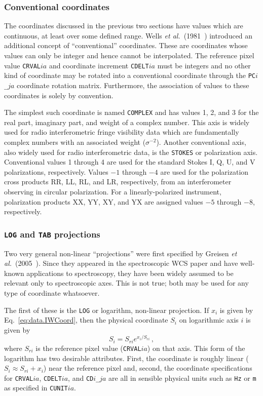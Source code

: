 \documentclass[twoside]{article}
\newcommand{\etal}{{\it et al.}}
\newcommand{\keyw}[1]{\hbox{{\tt #1}}}
\begin{document}
\subsubsection{Conventional coordinates}

The coordinates discussed in the previous two sections have values
which are continuous, at least over some defined range.  Wells
\etal~(1981~\cite{WGH81}) introduced an additional concept of
``conventional''  coordinates.  These are coordinates whose values can
only be integer and hence cannot be interpolated.  The reference pixel
value \keyw{CRVAL$ia$} and coordinate increment \keyw{CDELT$ia$} must
be integers and no other kind of coordinate may be rotated into a
conventional coordinate through the \keyw{PC$i$\_$ja$} coordinate
rotation matrix.  Furthermore, the association of values to these
coordinates is solely by convention.

The simplest such coordinate is named \keyw{COMPLEX} and has values 1,
2, and 3 for the real part, imaginary part, and weight of a complex
number.  This axis is widely used for radio interferometric fringe
visibility data which are fundamentally complex numbers with an
associated weight ($\sigma^{-2}$).  Another conventional axis, also
widely used for radio interferometric data, is the \keyw{STOKES} or
polarization axis.  Conventional values 1 through 4 are used for the
standard Stokes I, Q, U, and V polarizations, respectively.  Values
$-1$ through $-4$ are used for the polarization cross products RR, LL,
RL, and LR, respectively, from an interferometer observing in circular
polarization.  For a linearly-polarized instrument, polarization
products XX, YY, XY, and YX are assigned values $-5$ through $-8$,
respectively.

\subsubsection{\keyw{LOG} and \keyw{TAB} projections}
\label{sec:data.LOGTAB}

Two very general non-linear ``projections'' were first specified by
Greisen \etal~(2005~\cite{GCVA05}).  Since they appeared in the
spectroscopic WCS paper and have well-known applications to
spectroscopy, they have been widely assumed to be relevant only to
spectroscopic axes.  This is not true; both may be used for any type
of coordinate whatsoever.

The first of these is the \keyw{LOG} or logarithm, non-linear
projection.  If $x_i$ is given by Eq.~\ref{eq:data.IWCoord}, then
the physical coordinate $S_i$ on logarithmic axis $i$ is given by
\begin{equation}
    S_i = S_{ri} e^{x_i/S_{ri}}   \, ,
\end{equation}
where $S_{ri}$ is the reference pixel value (\keyw{CRVAL$ia$}) on that
axis.  This form of the logarithm has two desirable attributes.
First, the coordinate is roughly linear ($S_i \approx S_{ri} + x_i$)
near the reference pixel and, second, the coordinate specifications
for \keyw{CRVAL$ia$}, \keyw{CDELT$ia$}, and \keyw{CD$i$\_$ja$} are all in
sensible physical units such as \keyw{Hz} or \keyw{m} as specified in
\keyw{CUNIT$ia$}\@.
\end{document}
